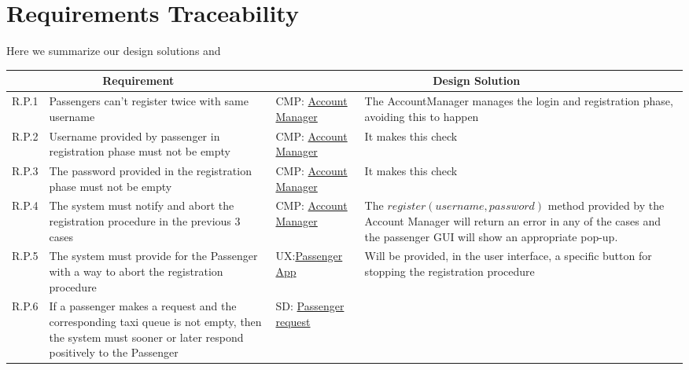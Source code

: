 \chapter{Requirements Traceability}\label{chapter:requirementsTraceability}
Here we summarize our design solutions and 
\begin{center}
\begin{longtable}{|p{}|p{}|>{\raggedright\arraybackslash}p{}|>{\raggedright\arraybackslash}p{}|}
\hline
\multicolumn{2}{|c|}{\textbf{Requirement}} & \multicolumn{2}{c|}{\textbf{Design Solution}} \\ \hline
R.P.1 & Passengers can't register twice with same username & CMP: \linebreak \hyperref[comp:accountManager]{Account Manager} & The AccountManager manages the login and registration phase, avoiding this to happen  \\ \hline
R.P.2 & Username provided by passenger in registration phase must not be empty & CMP: \linebreak \hyperref[comp:accountManager]{Account Manager} & It makes this check \\ \hline
R.P.3 & The password provided in the registration phase must not be empty & CMP: \linebreak \hyperref[comp:accountManager]{Account Manager} & It makes this check \\ \hline
R.P.4 & The system must notify and abort the registration procedure in the previous 3 cases & CMP: \linebreak \hyperref[comp:accountManager]{Account Manager} & The $register(username,password)$ method provided by the Account Manager will return an error in any of the cases and the passenger GUI will show an appropriate pop-up. \\ \hline
R.P.5 & The system must provide for the Passenger with a way to abort the registration procedure & UX:\linebreak \hyperref[ux:passengerApp]{Passenger App} & Will be provided, in the user interface, a specific button for stopping the registration procedure \\ \hline
R.P.6\label{R.P.6} & If a passenger makes a request and the corresponding taxi queue is not empty, then the system must sooner or later respond positively to the Passenger &
SD: \linebreak\hyperref[seq:passengerMakesRequest]{Passenger request}\linebreak \linebreak

\end{longtable}
\end{center}
